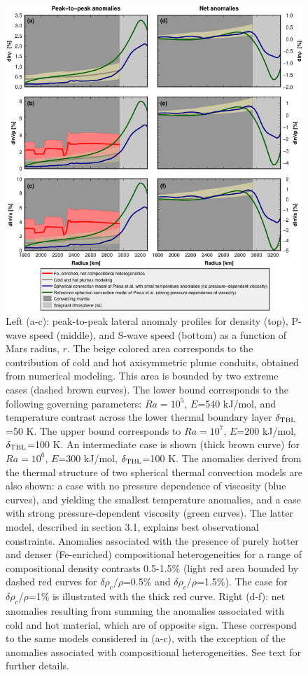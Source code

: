 \begin{figure}[hp!]
\begin{center}
\includegraphics[width=1.0\textwidth]
{figures/Fig3-3-3-3.png}
\caption{ Left (a-c): peak-to-peak lateral anomaly profiles for density (top), P-wave speed (middle), and S-wave speed (bottom) as a function of Mars radius, $r$. The beige colored area corresponds to the contribution of cold and hot axisymmetric plume conduits, obtained from numerical modeling. This area is bounded by two extreme cases (dashed brown curves). The lower bound corresponds to the following governing parameters: $Ra=10^5$, $E$=540 kJ/mol, and temperature contrast across the lower thermal boundary layer $\delta_{\rm TBL}$=50 K. The upper bound corresponds to $Ra=10^7$, $E$=200 kJ/mol, $\delta_{\rm TBL}$=100 K. An intermediate case is shown (thick brown curve) for $Ra=10^6$, $E$=300 kJ/mol, $\delta_{\rm TBL}$=100 K. The anomalies derived from the thermal structure of two spherical thermal convection models are also shown: a case with no pressure dependence of viscosity (blue curves), and yielding the smallest temperature anomalies, and a case with strong pressure-dependent viscosity (green curves). The latter model, described in section 3.1, explains best observational constraints. Anomalies associated with the presence of purely hotter and denser (Fe-enriched) compositional heterogeneities for a range of compositional density contrasts 0.5-1.5\% (light red area bounded by dashed red curves for $\delta \rho_c$/$\rho$=0.5\% and $\delta \rho_c$/$\rho$=1.5\%). The case for $\delta \rho_c$/$\rho$=1\% is illustrated with the thick red curve. Right (d-f): net anomalies resulting from summing the anomalies associated with cold and hot material, which are of opposite sign. These correspond to the same models considered in (a-c), with the exception of the anomalies associated with compositional heterogeneities. See text for further details.}
\label{fig:lateral_mantle_anomalies} 
\end{center}
\end{figure}

